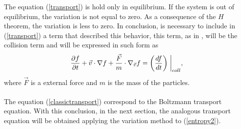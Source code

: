 \documentclass{article}
\begin{document}
{The equation (\ref{transport}) is hold only in equilibrium. If the system is out of equilibrium, the variation is not equal to zero. As a consequence of the $H$ theorem, the variation is less to zero. In conclusion, is necessary to include in (\ref{transport}) a term that described this behavior, this term, as in \cite{huang}, will be the collision term and will be expressed in such form as
\begin{equation}
    \frac{\partial f}{\partial t}+\vec{v}\cdot \nabla f+\frac{\vec{F}}{m}\cdot \nabla_{\vec{v}} f=\left( \frac{df}{dt} \right)\biggm |_{coll},\label{classictransport}
\end{equation}
where $\vec{F}$ is a external force and $m$ is the mass of the particles.\\
\\
The equation (\ref{classictransport}) correspond to the Boltzmann transport equation. With this conclusion, in the next section, the analogous transport equation will be obtained applying the variation method to (\ref{entropy2}).}
\end{document}
